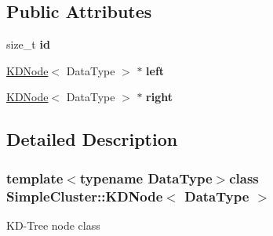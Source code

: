 \subsection*{Public Attributes}
\begin{DoxyCompactItemize}
\item 
\hypertarget{classSimpleCluster_1_1KDNode_a52213b503b615e0bef3c2b636ddd0095}{size\+\_\+t {\bfseries id}}\label{classSimpleCluster_1_1KDNode_a52213b503b615e0bef3c2b636ddd0095}

\item 
\hypertarget{classSimpleCluster_1_1KDNode_ad9f90c910bc2fb96fc9b2c3710d89381}{\hyperlink{classSimpleCluster_1_1KDNode}{K\+D\+Node}$<$ Data\+Type $>$ $\ast$ {\bfseries left}}\label{classSimpleCluster_1_1KDNode_ad9f90c910bc2fb96fc9b2c3710d89381}

\item 
\hypertarget{classSimpleCluster_1_1KDNode_a5e6c93ee710a457cf8d92afc86ffc13f}{\hyperlink{classSimpleCluster_1_1KDNode}{K\+D\+Node}$<$ Data\+Type $>$ $\ast$ {\bfseries right}}\label{classSimpleCluster_1_1KDNode_a5e6c93ee710a457cf8d92afc86ffc13f}

\end{DoxyCompactItemize}


\subsection{Detailed Description}
\subsubsection*{template$<$typename Data\+Type$>$class Simple\+Cluster\+::\+K\+D\+Node$<$ Data\+Type $>$}

K\+D-\/\+Tree node class 

